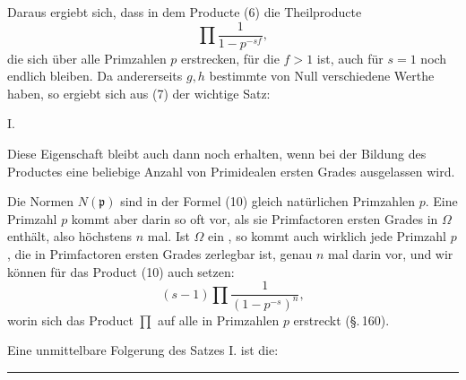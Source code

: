 Daraus ergiebt sich, dass in dem Producte (6) die Theilproducte
\[
\prod \frac{1}{1-p^{-sf}},
\]
die sich über alle Primzahlen $p$ erstrecken, für die $f>1$ ist, auch
für $s=1$ noch endlich bleiben. Da andererseits $g, h$ bestimmte
von Null verschiedene Werthe haben, so ergiebt sich aus (7) der
wichtige Satz:

I. 

Diese Eigenschaft bleibt auch dann noch erhalten, wenn bei
der Bildung des Productes eine beliebige  Anzahl von
Primidealen ersten Grades ausgelassen wird.

Die Normen $N(\mathfrak{p})$ sind in der Formel (10) gleich natürlichen
Primzahlen $p$. Eine Primzahl $p$ kommt aber darin so oft
vor, als sie Primfactoren ersten Grades in $\Omega$ enthält, also höchstens
$n$ mal. Ist $\Omega$ ein , so kommt auch wirklich
jede Primzahl $p$, die in Primfactoren ersten Grades zerlegbar
ist, genau $n$ mal darin vor, und wir können für das Product (10)
auch setzen:
\[
(s-1)\prod\frac{1}{(1-p^{-s})^n},
\]
worin sich das Product $\prod$ auf alle in  Primzahlen $p$ erstreckt (\S.\,160).

Eine unmittelbare Folgerung des Satzes I. ist die:


\begin{center}
\rule{6em}{0.4pt}
\end{center}
